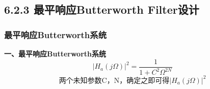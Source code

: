 \documentclass[notheorems,compress,mathserif,table]{beamer}
\begin{document}
\subsection{6.2.3 最平响应Butterworth Filter设计}

\begin{frame}[shrink]\frametitle{最平响应Butterworth系统}%

\textbf{一、最平响应Butterworth系统}
$$|H_{a}(j\Omega)|^{2}= \frac{1}{1+C^{2}\Omega^{2N}}$$
$$  \mbox{两个未知参数C，N，确定之即可得$|H_{a}(j\Omega)|^{2}$} $$
\end{frame}


\end{document}
